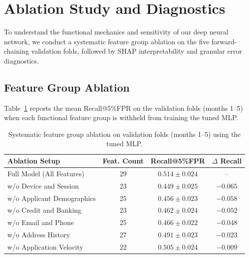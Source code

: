 
\section{Ablation Study and Diagnostics}
\label{sec:ablation_diagnostics}

To understand the functional mechanics and sensitivity of our deep neural network, we conduct a systematic feature group ablation on the five forward-chaining validation folds, followed by SHAP interpretability and granular error diagnostics.

\subsection{Feature Group Ablation}
Table~\ref{tab:ablation} reports the mean Recall@5\%FPR on the validation folds (months 1--5) when each functional feature group is withheld from training the tuned MLP.

\begin{table}[!t]
\centering
\caption{Systematic feature group ablation on validation folds (months 1--5) using the tuned MLP.}
\label{tab:ablation}
\footnotesize
\setlength{\tabcolsep}{4.5pt}
\begin{tabular}{lccc}
\hline
Ablation Setup & Feat. Count & Recall@5\%FPR & $\Delta$ Recall \\
\hline
Full Model (All Features)     & 29 & $0.514 \pm 0.024$ & -- \\
w/o Device and Session        & 23 & $0.449 \pm 0.025$ & $-0.065$ \\
w/o Applicant Demographics    & 25 & $0.456 \pm 0.023$ & $-0.058$ \\
w/o Credit and Banking        & 23 & $0.462 \pm 0.024$ & $-0.052$ \\
w/o Email and Phone           & 25 & $0.466 \pm 0.022$ & $-0.048$ \\
w/o Address History           & 27 & $0.491 \pm 0.023$ & $-0.023$ \\
w/o Application Velocity      & 22 & $0.505 \pm 0.024$ & $-0.009$ \\
\hline
\end{tabular}
\end{table}

